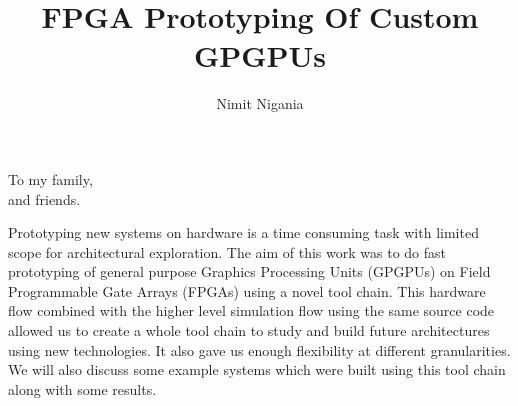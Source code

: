 \documentclass[12pt]{gatech-thesis}
\title{FPGA Prototyping Of Custom GPGPUs} %
\author{Nimit Nigania}
\begin{document}

\begin{preliminary}
\begin{dedication}
\null\vfil
{\large
\begin{center}
To my family,\\\vspace{12pt}
and friends.\\\vspace{12pt}

\end{center}}
\vfil\null
\end{dedication}

\begin{preface}
Prototyping new systems on hardware is a time consuming task with limited scope for architectural exploration. The aim of this work was to do fast prototyping of general purpose Graphics Processing Units (GPGPUs) on Field Programmable Gate Arrays (FPGAs) using a novel tool chain. This hardware flow combined with the higher level simulation flow using the same source code allowed us to create a whole tool chain to study and build future architectures using new technologies. It also gave us enough flexibility at different granularities. We will also discuss some example systems which were built using this tool chain along with some results.
\end{preface}

\begin{acknowledgements}

\end{acknowledgements}
\contents
\end{preliminary}
\pagebreak
\noindent
\end{document}
